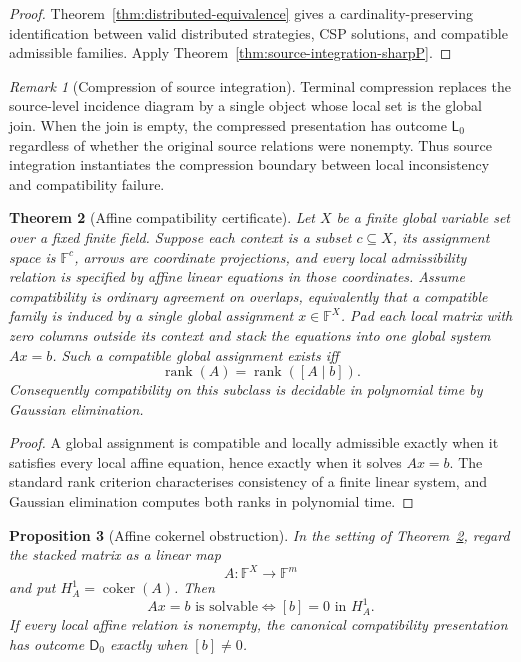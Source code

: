 \documentclass[11pt]{article}
\theoremstyle{plain}
\newtheorem{theorem}{Theorem}[section]
\newtheorem{proposition}[theorem]{Proposition}
\theoremstyle{definition}
\theoremstyle{remark}
\newtheorem{remark}[theorem]{Remark}
\begin{document}
\begin{proof}
Theorem~\ref{thm:distributed-equivalence} gives a cardinality-preserving
identification between valid distributed strategies, CSP solutions, and
compatible admissible families. Apply
Theorem~\ref{thm:source-integration-sharpP}.
\end{proof}

\begin{remark}[Compression of source integration]
Terminal compression replaces the source-level incidence diagram by a single
object whose local set is the global join. When the join is empty, the compressed
presentation has outcome $\mathsf L_0$ regardless of whether the original source
relations were nonempty. Thus source integration instantiates the compression
boundary between local inconsistency and compatibility failure.
\end{remark}

\begin{theorem}[Affine compatibility certificate]\label{thm:affine-certificate}
Let $X$ be a finite global variable set over a fixed finite field. Suppose each
context is a subset $c\subseteq X$, its assignment space is $\mathbb F^c$,
arrows are coordinate projections, and every local admissibility relation is
specified by affine linear equations in those coordinates. Assume compatibility is ordinary agreement on overlaps, equivalently that a
compatible family is induced by a single global assignment $x\in\mathbb F^X$.
Pad each local matrix with zero columns outside its context and stack the
equations into one global system $Ax=b$. Such a compatible global assignment
exists iff
\[
\operatorname{rank}(A)=\operatorname{rank}([A\mid b]).
\]
Consequently compatibility on this subclass is decidable in polynomial time by
Gaussian elimination.
\end{theorem}

\begin{proof}
A global assignment is compatible and locally admissible exactly when it
satisfies every local affine equation, hence exactly when it solves $Ax=b$.
The standard rank criterion characterises consistency of a finite linear system,
and Gaussian elimination computes both ranks in polynomial time.
\end{proof}


\begin{proposition}[Affine cokernel obstruction]\label{prop:affine-cokernel}
In the setting of Theorem~\ref{thm:affine-certificate}, regard the stacked
matrix as a linear map
\[
A:\mathbb F^X\longrightarrow\mathbb F^m
\]
and put $H_A^1=\operatorname{coker}(A)$. Then
\[
Ax=b\text{ is solvable}
\iff [b]=0\text{ in }H_A^1.
\]
If every local affine relation is nonempty, the canonical compatibility
presentation has outcome $\mathsf D_0$ exactly when $[b]\ne0$.
\end{proposition}
\end{document}
